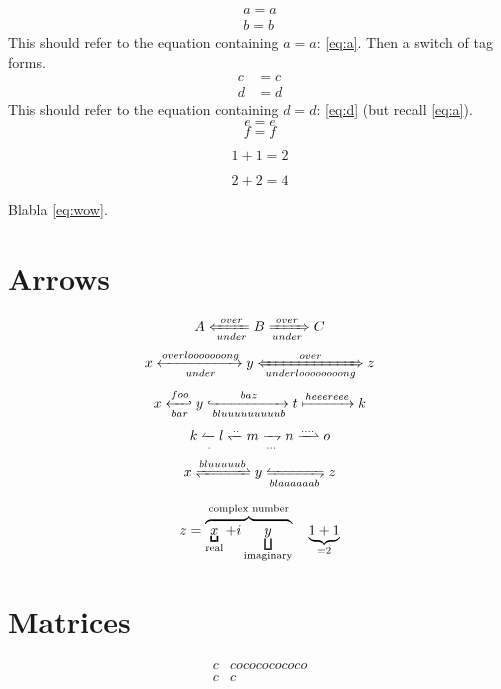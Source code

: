 \documentclass{article}
\begin{document}
\begin{gather}
a=a \label{eq:a} \\
b=b \label{eq:b} \tag{**}
\end{gather}
This should refer to the equation containing $a=a$: \eqref{eq:a}.
Then a switch of tag forms.
\begin{align}
c&=c \label{eq:c} \\
d&=d \label{eq:d}
\end{align}
This should refer to the equation containing $d=d$: \eqref{eq:d}
(but recall \eqref{eq:a}).
\begin{equation}
e=e
\end{equation}
\begin{equation}
f=f
\end{equation}


\begin{equation*}
1+1=2 \label{eq:much}
\end{equation*}

\begin{equation*}
2+2=4 \label{eq:wow}
\end{equation*}

Blabla \eqref{eq:wow}.

\section{Arrows}

\[
A \xLeftarrow[under]{over} B \xRightarrow[under]{over} C
\]
\[
x \xleftrightarrow[under]{overlooooooong} y \xLeftrightarrow[underloooooooong]{over} z
\]
\[
x \xhookleftarrow[bar]{foo} y \xhookrightarrow[bluuuuuuuuub]{baz} t \xmapsto{heeereee} k
\]
\[
k \xleftharpoonup[.]{} l \xleftharpoondown{..} m \xrightharpoondown[...]{} n \xrightharpoonup{....} o
\]
\[
x \xrightleftharpoons{bluuuuub} y \xleftrightharpoons[blaaaaaab]{} z
\]


\[
z = \LaTeXoverbrace{
   \underbracket{x}_\text{real} + i
      \underbracket[1pt][7pt]{y}_\text{imaginary}
        }^\text{complex number}
\quad
\underbrace{1+1}_{=2}
\]

\section{Matrices}

\[
\begin{matrix*}
c & cocococococo \\
c & c
\end{matrix*}
\]
\end{document}
